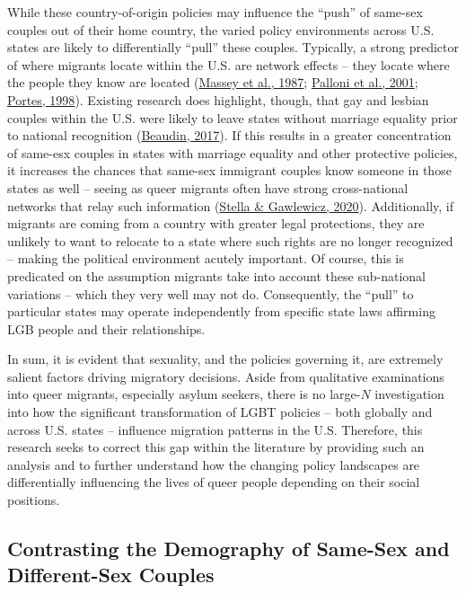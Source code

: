 \documentclass[
  11pt,
]{article}
\begin{document}
While these country-of-origin policies may influence the ``push'' of same-sex couples out of their home country, the varied policy environments across U.S. states are likely to differentially ``pull'' these couples. Typically, a strong predictor of where migrants locate within the U.S. are network effects -- they locate where the people they know are located (\protect\hyperlink{ref-massey_1987}{Massey et al., 1987}; \protect\hyperlink{ref-palloni_2001}{Palloni et al., 2001}; \protect\hyperlink{ref-portes_1998}{Portes, 1998}). Existing research does highlight, though, that gay and lesbian couples within the U.S. were likely to leave states without marriage equality prior to national recognition (\protect\hyperlink{ref-beaudin_2017}{Beaudin, 2017}). If this results in a greater concentration of same-esx couples in states with marriage equality and other protective policies, it increases the chances that same-sex immigrant couples know someone in those states as well -- seeing as queer migrants often have strong cross-national networks that relay such information (\protect\hyperlink{ref-stella_2020}{Stella \& Gawlewicz, 2020}). Additionally, if migrants are coming from a country with greater legal protections, they are unlikely to want to relocate to a state where such rights are no longer recognized -- making the political environment acutely important. Of course, this is predicated on the assumption migrants take into account these sub-national variations -- which they very well may not do. Consequently, the ``pull'' to particular states may operate independently from specific state laws affirming LGB people and their relationships.

In sum, it is evident that sexuality, and the policies governing it, are extremely salient factors driving migratory decisions. Aside from qualitative examinations into queer migrants, especially asylum seekers, there is no large-\(N\) investigation into how the significant transformation of LGBT policies -- both globally and across U.S. states -- influence migration patterns in the U.S. Therefore, this research seeks to correct this gap within the literature by providing such an analysis and to further understand how the changing policy landscapes are differentially influencing the lives of queer people depending on their social positions.

\hypertarget{contrasting-the-demography-of-same-sex-and-different-sex-couples}{%
\subsection{Contrasting the Demography of Same-Sex and Different-Sex Couples}\label{contrasting-the-demography-of-same-sex-and-different-sex-couples}}
\end{document}
